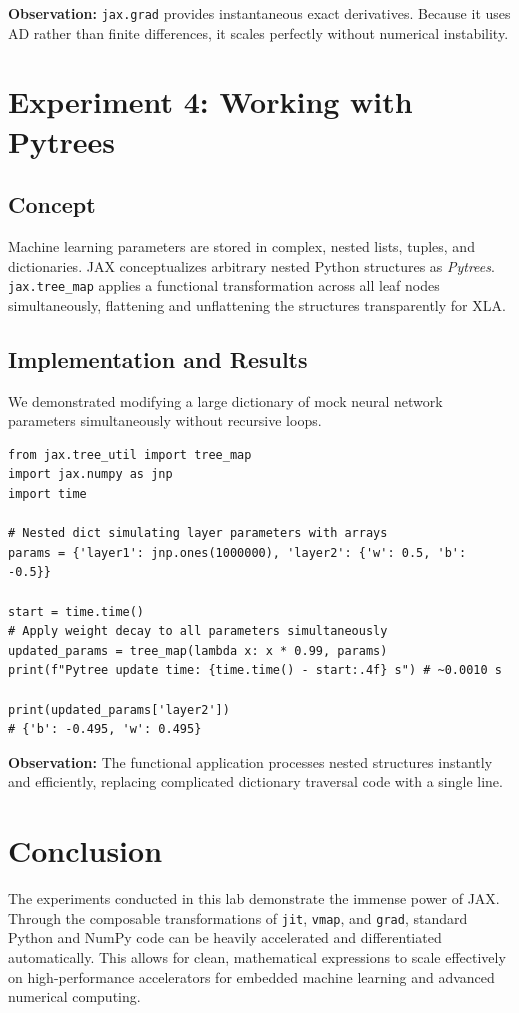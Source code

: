 \documentclass[12pt, a4paper]{article}
\begin{document}
\textbf{Observation:} \texttt{jax.grad} provides instantaneous exact derivatives. Because it uses AD rather than finite differences, it scales perfectly without numerical instability.

\section{Experiment 4: Working with Pytrees}
\subsection{Concept}
Machine learning parameters are stored in complex, nested lists, tuples, and dictionaries. JAX conceptualizes arbitrary nested Python structures as \textit{Pytrees}. \texttt{jax.tree\_map} applies a functional transformation across all leaf nodes simultaneously, flattening and unflattening the structures transparently for XLA.

\subsection{Implementation and Results}
We demonstrated modifying a large dictionary of mock neural network parameters simultaneously without recursive loops.

\begin{lstlisting}[caption={Pytree Manipulation Experiment}]
from jax.tree_util import tree_map
import jax.numpy as jnp
import time

# Nested dict simulating layer parameters with arrays
params = {'layer1': jnp.ones(1000000), 'layer2': {'w': 0.5, 'b': -0.5}}

start = time.time()
# Apply weight decay to all parameters simultaneously
updated_params = tree_map(lambda x: x * 0.99, params)
print(f"Pytree update time: {time.time() - start:.4f} s") # ~0.0010 s

print(updated_params['layer2'])
# {'b': -0.495, 'w': 0.495}
\end{lstlisting}

\textbf{Observation:} The functional application processes nested structures instantly and efficiently, replacing complicated dictionary traversal code with a single line.

\section{Conclusion}
The experiments conducted in this lab demonstrate the immense power of JAX. Through the composable transformations of \texttt{jit}, \texttt{vmap}, and \texttt{grad}, standard Python and NumPy code can be heavily accelerated and differentiated automatically. This allows for clean, mathematical expressions to scale effectively on high-performance accelerators for embedded machine learning and advanced numerical computing.
\end{document}
